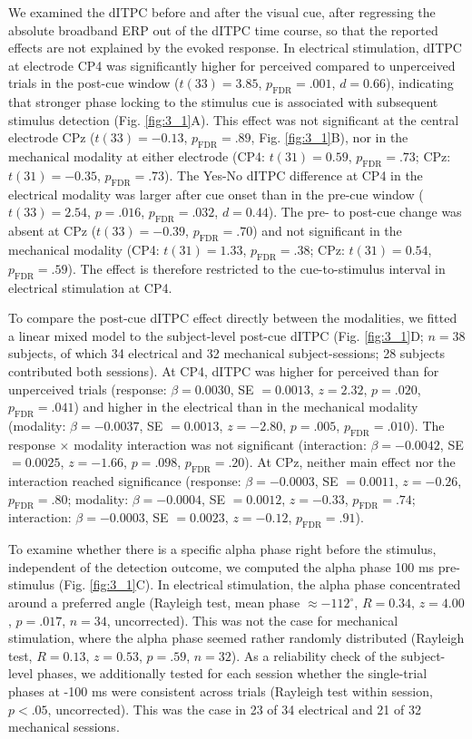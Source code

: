 \documentclass[11pt,a4paper,onecolumn]{article}
\begin{document}
We examined the dITPC before and after the visual cue, after regressing the absolute broadband ERP out of the dITPC time course, so that the reported effects are not explained by the evoked response. In electrical stimulation, dITPC at electrode CP4 was significantly higher for perceived compared to unperceived trials in the post-cue window ($t(33) = 3.85$, $p_\mathrm{FDR} = .001$, $d = 0.66$), indicating that stronger phase locking to the stimulus cue is associated with subsequent stimulus detection (Fig. \ref{fig:3_1}A).
This effect was not significant at the central electrode CPz ($t(33) = -0.13$, $p_\mathrm{FDR} = .89$, Fig. \ref{fig:3_1}B), nor in the mechanical modality at either electrode (CP4: $t(31) = 0.59$, $p_\mathrm{FDR} = .73$; CPz: $t(31) = -0.35$, $p_\mathrm{FDR} = .73$).
The Yes-No dITPC difference at CP4 in the electrical modality was larger after cue onset than in the pre-cue window ($t(33) = 2.54$, $p = .016$, $p_\mathrm{FDR} = .032$, $d = 0.44$). The pre- to post-cue change was absent at CPz ($t(33) = -0.39$, $p_\mathrm{FDR} = .70$) and not significant in the mechanical modality (CP4: $t(31) = 1.33$, $p_\mathrm{FDR} = .38$; CPz: $t(31) = 0.54$, $p_\mathrm{FDR} = .59$). The effect is therefore restricted to the cue-to-stimulus interval in electrical stimulation at CP4.

To compare the post-cue dITPC effect directly between the modalities, we fitted a linear mixed model to the subject-level post-cue dITPC (Fig. \ref{fig:3_1}D; $n = 38$ subjects, of which 34 electrical and 32 mechanical subject-sessions; 28 subjects contributed both sessions). At CP4, dITPC was higher for perceived than for unperceived trials (response: $\beta = 0.0030$, SE $= 0.0013$, $z = 2.32$, $p = .020$, $p_\mathrm{FDR} = .041$) and higher in the electrical than in the mechanical modality (modality: $\beta = -0.0037$, SE $= 0.0013$, $z = -2.80$, $p = .005$, $p_\mathrm{FDR} = .010$). The response $\times$ modality interaction was not significant (interaction: $\beta = -0.0042$, SE $= 0.0025$, $z = -1.66$, $p = .098$, $p_\mathrm{FDR} = .20$). At CPz, neither main effect nor the interaction reached significance (response: $\beta = -0.0003$, SE $= 0.0011$, $z = -0.26$, $p_\mathrm{FDR} = .80$; modality: $\beta = -0.0004$, SE $= 0.0012$, $z = -0.33$, $p_\mathrm{FDR} = .74$; interaction: $\beta = -0.0003$, SE $= 0.0023$, $z = -0.12$, $p_\mathrm{FDR} = .91$).

To examine whether there is a specific alpha phase right before the stimulus, independent of the detection outcome, we computed the alpha phase 100 ms pre-stimulus (Fig. \ref{fig:3_1}C). In electrical stimulation, the alpha phase concentrated around a preferred angle (Rayleigh test, mean phase $\approx -112^{\circ}$, $R = 0.34$, $z = 4.00$, $p = .017$, $n = 34$, uncorrected).
This was not the case for mechanical stimulation, where the alpha phase seemed rather randomly distributed (Rayleigh test, $R = 0.13$, $z = 0.53$, $p = .59$, $n = 32$). As a reliability check of the subject-level phases, we additionally tested for each session whether the single-trial phases at -100 ms were consistent across trials (Rayleigh test within session, $p < .05$, uncorrected). This was the case in 23 of 34 electrical and 21 of 32 mechanical sessions.
\end{document}

